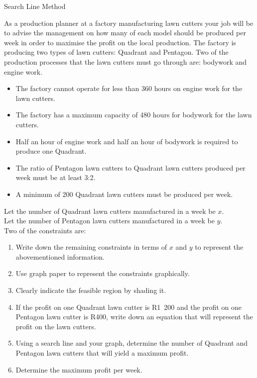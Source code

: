 \begin{wex}
{Search Line Method}{As a production planner at a factory manufacturing lawn cutters your job
will be to advise the management on how many of each model should be produced per week in
order to maximise the profit on the local production. The factory is producing two types of
lawn cutters: Quadrant and Pentagon.
Two of the production processes that the lawn cutters must go through are: bodywork and engine
work.
\begin{itemize}
\item{The factory cannot operate for less than 360 hours on engine work for the lawn cutters.}
\item{The factory has a maximum capacity of 480 hours for bodywork for the lawn cutters.}
\item{Half an hour of engine work and half an hour of bodywork is required to produce one
Quadrant.}
\item{The ratio of Pentagon lawn cutters to Quadrant lawn cutters produced per week must be at
least 3:2.}
\item{A minimum of 200 Quadrant lawn cutters must be produced per week.}
\end{itemize}
Let the number of Quadrant lawn cutters manufactured in a week be $x$.\\
Let the number of Pentagon lawn cutters manufactured in a week be $y$.\\
Two of the constraints are:
\begin{enumerate}
\item{Write down the remaining constraints in terms of $x$ and $y$ to represent the abovementioned
information.}
\item{Use graph paper to represent the constraints graphically.}
\item{Clearly indicate the feasible region by shading it.}
\item{If the profit on one Quadrant lawn cutter is R1~200 and the profit on one Pentagon
lawn cutter is R400, write down an equation that will represent the profit on the
lawn cutters.}
\item{Using a search line and your graph, determine the number of Quadrant and
Pentagon lawn cutters that will yield a maximum profit.}
\item{Determine the maximum profit per week.}
\end{enumerate}
}{

}
\end{wex}
